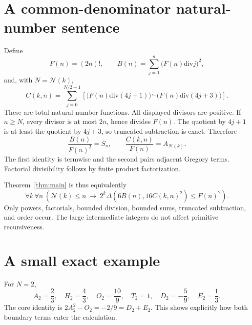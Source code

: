 \documentclass[11pt,a4paper]{article}
\theoremstyle{remark}\newtheorem{remark}[theorem]{Remark}
\newcommand{\cut}{\mathcal N}
\newcommand{\dm}{\mathbin{\dot{-}}}
\begin{document}
\appendix
\section{A common-denominator natural-number sentence}\label{app:factorial}

Define
\[
 F(n)=(2n)!,\qquad
 B(n)=\sum_{j=1}^{n}\bigl(F(n)\mathbin{\mathrm{div}}j\bigr)^2,
\]
and, with $N=\cut(k)$,
\[
 C(k,n)=\sum_{j=0}^{N/2-1}
 \left[
   \bigl(F(n)\mathbin{\mathrm{div}}(4j+1)\bigr)
   \dm
   \bigl(F(n)\mathbin{\mathrm{div}}(4j+3)\bigr)
 \right].
\]
These are total natural-number functions. All displayed divisors
are positive. If $n\ge N$, every divisor is at most $2n$, hence
divides $F(n)$. The quotient by $4j+1$ is at least the quotient
by $4j+3$, so truncated subtraction is exact. Therefore
\[
 \frac{B(n)}{F(n)^2}=S_n,\qquad
 \frac{C(k,n)}{F(n)}=A_{\cut(k)}.
\]
The first identity is termwise and the second pairs adjacent
Gregory terms. Factorial divisibility follows by finite product
factorization.

Theorem~\ref{thm:main} is thus equivalently
\begin{equation}\label{eq:factorialmain}
 \boxed{\displaystyle
 \forall k\,\forall n\
 \left(\cut(k)\le n\ \longrightarrow\
 2^k\Delta(6B(n),16C(k,n)^2)\le F(n)^2\right).}
\end{equation}
Only powers, factorials, bounded division, bounded sums, truncated
subtraction, and order occur. The large intermediate integers do not
affect primitive recursiveness.

\section{A small exact example}

For $N=2$,
\[
 A_2=\frac23,\quad H_2=\frac43,\quad O_2=\frac{10}{9},
 \quad T_2=1,\quad D_2=-\frac59,\quad E_2=\frac13.
\]
The core identity is
$2A_2^2-O_2=-2/9=D_2+E_2$.
This shows explicitly how both boundary terms enter the calculation.
\end{document}
